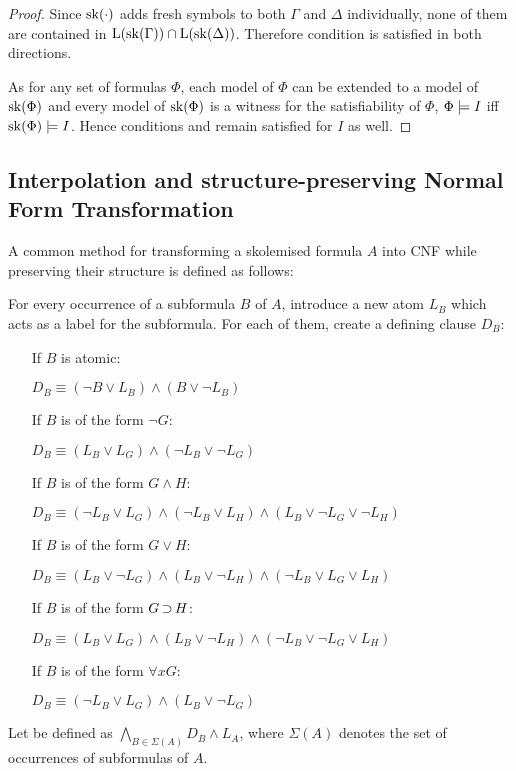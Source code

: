 \begin{proof}
	Since $\operatorname{sk}(\cdot)$ adds fresh symbols to both $\Gamma$ and $\Delta$ individually,
	none of them are contained in $\operatorname{L}(\operatorname{sk}(\Gamma)) \cap \operatorname{L}(\operatorname{sk}(\Delta))$.
	Therefore condition  is satisfied in both directions.

	As for any set of formulas $\Phi$, each model of $\Phi$ can be extended to a model of $\operatorname{sk}(\Phi)$ and every model of $\operatorname{sk}(\Phi)$ is a witness for the satisfiability of $\Phi$, $\Phi \models I$ iff $\operatorname{sk}(\Phi) \models I$.
	Hence conditions  and  remain satisfied for $I$ as well.
\end{proof}


\subsection{Interpolation and structure-preserving Normal Form Transformation}

A common method for transforming a skolemised formula $A$ into CNF while preserving their structure is defined as follows:

\begin{defi}
For every occurrence of a subformula $B$ of $A$, introduce a new atom $L_B$ which acts as a label for the subformula. 
For each of them, create a defining clause $D_B$:

\begin{itemize}
	\item[If $B$ is atomic:]~

	$D_B\equiv (\lnot B \lor L_B) \land (B \lor \lnot L_B)  $
	\item[If $B$ is of the form $\lnot G$:]~

	$D_B\equiv (L_B \lor L_G) \land (\lnot L_B \lor \lnot L_G)  $
	\item[If $B$ is of the form $G \land H$:]~

		$D_B\equiv (\lnot L_B \lor L_G) \land (\lnot L_B \lor L_H) \land (L_B \lor \lnot L_G \lor \lnot L_H)  $
	\item[If $B$ is of the form $G \lor H$:]~

		$D_B\equiv (L_B \lor \lnot L_G) \land (L_B \lor \lnot L_H) \land (\lnot L_B \lor L_G \lor L_H)  $
	\item[If $B$ is of the form $G \operatorname{\supset} H$:]~

		$D_B\equiv (L_B \lor L_G) \land (L_B \lor \lnot L_H) \land (\lnot L_B \lor \lnot L_G \lor L_H)  $
	\item[If $B$ is of the form $\forall x G$:]~

		$D_B\equiv (\lnot L_B \lor L_G) \land (L_B \lor \lnot L_G)$
\end{itemize}

Let  be defined as $\bigwedge_{B \in \Sigma(A)} D_B \land L_A$, where $\Sigma(A)$ denotes the set of occurrences of subformulas of $A$.
\end{defi}

